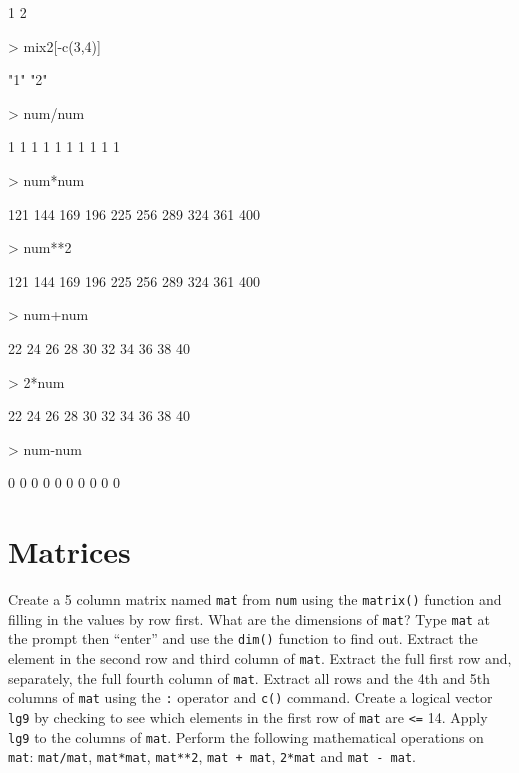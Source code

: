 \documentclass[12pt]{article}
\newcommand{\code}[1]{{\texttt{#1}}}
\begin{document}
\begin{Schunk}
\begin{Soutput}
[1] 1 2
\end{Soutput}
\begin{Sinput}
> mix2[-c(3,4)]
\end{Sinput}
\begin{Soutput}
[1] "1" "2"
\end{Soutput}
\begin{Sinput}
> num/num
\end{Sinput}
\begin{Soutput}
 [1] 1 1 1 1 1 1 1 1 1 1
\end{Soutput}
\begin{Sinput}
> num*num
\end{Sinput}
\begin{Soutput}
 [1] 121 144 169 196 225 256 289 324 361 400
\end{Soutput}
\begin{Sinput}
> num**2
\end{Sinput}
\begin{Soutput}
 [1] 121 144 169 196 225 256 289 324 361 400
\end{Soutput}
\begin{Sinput}
> num+num
\end{Sinput}
\begin{Soutput}
 [1] 22 24 26 28 30 32 34 36 38 40
\end{Soutput}
\begin{Sinput}
> 2*num
\end{Sinput}
\begin{Soutput}
 [1] 22 24 26 28 30 32 34 36 38 40
\end{Soutput}
\begin{Sinput}
> num-num
\end{Sinput}
\begin{Soutput}
 [1] 0 0 0 0 0 0 0 0 0 0
\end{Soutput}
\end{Schunk}
 

\section{Matrices}

Create a 5 column matrix named \code{mat} from \code{num} using the \code{matrix()} function and filling in the values by row first.  What are the dimensions of \code{mat}?  Type \code{mat} at the prompt then ``enter'' and use the \code{dim()} function to find out.  Extract the element in the second row and third column of \code{mat}.  Extract the full first row and, separately, the full fourth column of \code{mat}.  Extract all rows and the 4th and 5th columns of \code{mat} using the \code{:} operator and \code{c()} command.   Create a logical vector \code{lg9} by checking to see which elements in the first row of \code{mat} are \code{<=} 14.  Apply \code{lg9} to the columns of \code{mat}.  Perform the following mathematical operations on \code{mat}: \code{mat/mat}, \code{mat*mat}, \code{mat**2}, \code{mat + mat}, \code{2*mat} and \code{mat - mat}.      
\end{document}
